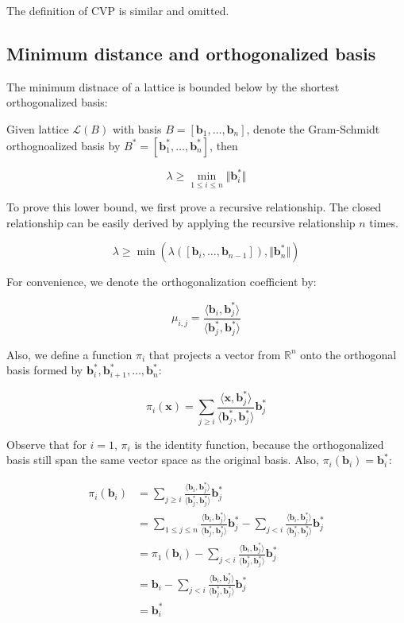 The definition of CVP is similar and omitted.

\subsection{Minimum distance and orthogonalized basis}
The minimum distnace of a lattice is bounded below by the shortest orthogonalized basis:

\begin{theorem}
    Given lattice $\mathcal{L}(B)$ with basis $B = [\mathbf{b}_1, \ldots, \mathbf{b}_n]$, denote the Gram-Schmidt orthognoalized basis by $B^\ast = [\mathbf{b}_1^\ast, \ldots, \mathbf{b}_n^\ast]$, then

    $$
    \lambda \geq \min_{1 \leq i \leq n} \Vert \mathbf{b}_i^\ast \Vert
    $$
\end{theorem}

To prove this lower bound, we first prove a recursive relationship. The closed relationship can be easily derived by applying the recursive relationship $n$ times.

$$
\lambda \geq \min(
    \lambda([\mathbf{b}_i, \ldots, \mathbf{b}_{n-1}]),
    \Vert\mathbf{b}_n^\ast\Vert
)
$$

For convenience, we denote the orthogonalization coefficient by:

$$
\mu_{i, j} = \frac{\langle \mathbf{b}_i, \mathbf{b}_j^*\rangle}{\langle \mathbf{b}_j^*, \mathbf{b}_j^*\rangle}
$$

Also, we define a function $\pi_i$ that projects a vector from $\mathbb{R}^n$ onto the orthogonal basis formed by $\mathbf{b}_i^\ast, \mathbf{b}_{i+1}^\ast, \ldots, \mathbf{b}_n^\ast$:

$$
\pi_i(\mathbf{x}) = \sum_{j\geq i}\frac{\langle \mathbf{x}, \mathbf{b}_j^\ast\rangle}{\langle \mathbf{b}_j^\ast, \mathbf{b}_j^\ast \rangle}\mathbf{b}_j^\ast
$$

Observe that for $i = 1$, $\pi_i$ is the identity function, because the orthogonalized basis still span the same vector space as the original basis. Also, $\pi_i(\mathbf{b}_i) = \mathbf{b}_i^\ast$:

$$
\begin{aligned}
\pi_i(\mathbf{b}_i) &= \sum_{j\geq i}\frac{\langle \mathbf{b}_i, \mathbf{b}_j^\ast\rangle}{\langle \mathbf{b}_j^\ast, \mathbf{b}_j^\ast \rangle}\mathbf{b}_j^\ast \\
&= \sum_{1 \leq j \leq n}\frac{\langle \mathbf{b}_i, \mathbf{b}_j^\ast\rangle}{\langle \mathbf{b}_j^\ast, \mathbf{b}_j^\ast \rangle}\mathbf{b}_j^\ast  - \sum_{j < i}\frac{\langle \mathbf{b}_i, \mathbf{b}_j^\ast\rangle}{\langle \mathbf{b}_j^\ast, \mathbf{b}_j^\ast \rangle}\mathbf{b}_j^\ast \\
&= \pi_1(\mathbf{b}_i) - \sum_{j < i}\frac{\langle \mathbf{b}_i, \mathbf{b}_j^\ast\rangle}{\langle \mathbf{b}_j^\ast, \mathbf{b}_j^\ast \rangle}\mathbf{b}_j^\ast \\
&= \mathbf{b}_i - \sum_{j < i}\frac{\langle \mathbf{b}_i, \mathbf{b}_j^\ast\rangle}{\langle \mathbf{b}_j^\ast, \mathbf{b}_j^\ast \rangle}\mathbf{b}_j^\ast \\
&= \mathbf{b}_i^\ast
\end{aligned}
$$

